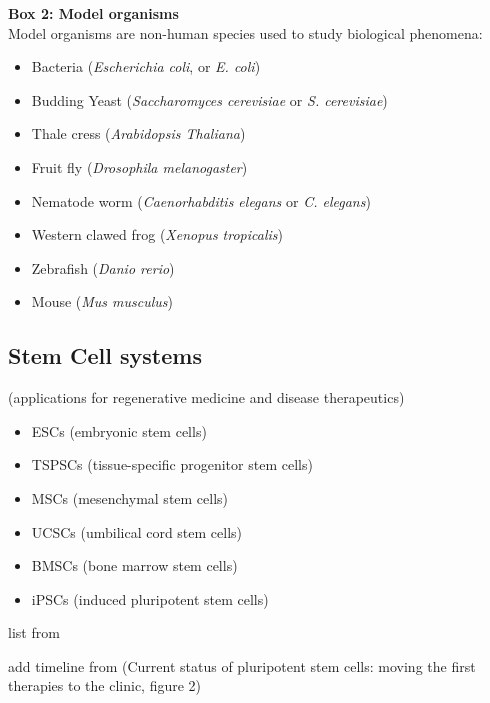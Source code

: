 \begin{Comment}
\hspace{-2.5mm}\textbf{Box 2: Model organisms}\label{box2}\\

Model organisms are non-human species used to study biological phenomena:

\begin{itemize}
    \item Bacteria (\textit{Escherichia coli}, or \textit{E. coli})
    \item Budding Yeast (\textit{Saccharomyces cerevisiae} or \textit{S. cerevisiae})
    \item Thale cress (\textit{Arabidopsis Thaliana})
    \item Fruit fly (\textit{Drosophila melanogaster})
    \item Nematode worm (\textit{Caenorhabditis elegans} or \textit{C. elegans})
    \item Western clawed frog (\textit{Xenopus tropicalis})
    \item Zebrafish (\textit{Danio rerio})
    \item Mouse (\textit{Mus musculus})

\end{itemize}


\end{Comment}


\subsection{Stem Cell systems}

(applications for regenerative medicine and disease therapeutics)

\begin{itemize}
    \item ESCs (embryonic stem cells)
    \item TSPSCs (tissue-specific progenitor stem cells)
    \item MSCs (mesenchymal stem cells)
    \item UCSCs (umbilical cord stem cells)
    \item BMSCs (bone marrow stem cells)
    \item iPSCs (induced pluripotent stem cells)
\end{itemize}

list from \cite{mahla2016stem}


add timeline from (Current status of pluripotent stem cells: moving the first therapies to the clinic,  figure 2)

